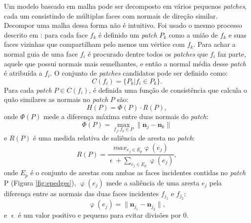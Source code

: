 Um modelo baseado em malha pode ser decomposto em vários pequenos \textit{patches}, cada um consistindo de múltiplas faces com normais de direção similar. Decompor uma malha dessa forma não é intuitivo. Foi usado o mesmo processo descrito em \cite{zhang2015guided}: para cada face $f_k$ é definido um \textit{patch} $P_k$ como a união de $f_k$ e suas faces vizinhas que compartilham pelo menos um vértice com $f_k$. Para achar a normal guia de uma face $f_i$ é procurado dentre todos os \textit{patches} que $f_i$ faz parte, aquele que possui normais mais semelhantes, e então a normal média desse \textit{patch} é atribuída a $f_i$. O conjunto de \textit{patches} candidatos pode ser definido como:
\begin{equation}
    C(f_i) = \{P_k | f_i \in P_k\}.
\end{equation}
Para cada \textit{patch} $P \in C(f_i)$, é definida uma função de consistência que calcula o quão similares as normais no \textit{patch} $P$ são:
\begin{equation} \label{eq:consistencyfunc}
    H(P) = \Phi(P)\cdot R(P),
\end{equation}
onde $\Phi(P)$ mede a diferença máxima entre duas normais do \textit{patch}:
\begin{equation}
    \Phi(P) = \mathop{max}_{f_j,f_k \in P} \|\textbf{n}_j - \textbf{n}_k \| 
\end{equation}
e $R(P)$ é uma medida relativa de saliência de aresta no \textit{patch}:
\begin{equation}
    R(P) = \frac{max_{e_j\in E_p} \upvarphi(e_j)}{ \upvarepsilon + \sum_{e_j\in E_p}{\upvarphi(e_j)} },
\end{equation}
onde $E_p$ é o conjunto de arestas com ambas as faces incidentes contidas no \textit{patch} P (Figura \ref{fig:epedges}), $\upvarphi(e_j)$ mede a saliência de uma aresta $e_j$ pela diferença entre as normais das duas faces incidentes $f_{j_1}$ e $f_{j_2}$:
\begin{equation}
    \upvarphi(e_j) = \|\textbf{n}_{j_1} - \textbf{n}_{j_2} \|,
\end{equation}
e $\upvarepsilon$ é um valor positivo e pequeno para evitar divisões por $0$.

